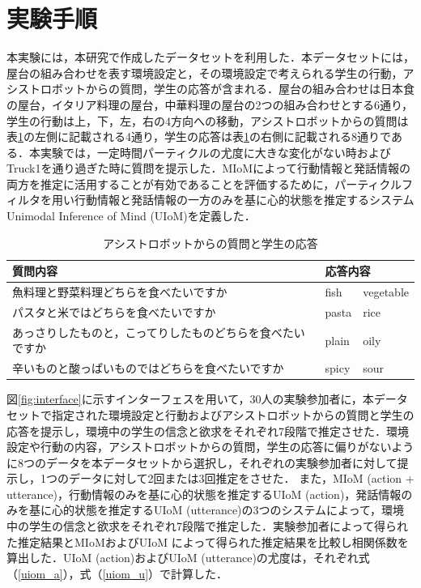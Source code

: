 \section{実験手順}

\par
本実験には，本研究で作成したデータセットを利用した．本データセットには，屋台の組み合わせを表す環境設定と，その環境設定で考えられる学生の行動，アシストロボットからの質問，学生の応答が含まれる．屋台の組み合わせは日本食の屋台，イタリア料理の屋台，中華料理の屋台の2つの組み合わせとする6通り，学生の行動は上，下，左，右の4方向への移動，アシストロボットからの質問は表\ref{tab:q_a}の左側に記載される4通り，学生の応答は表\ref{tab:q_a}の右側に記載される8通りである．本実験では，一定時間パーティクルの尤度に大きな変化がない時およびTruck1を通り過ぎた時に質問を提示した．MIoMによって行動情報と発話情報の両方を推定に活用することが有効であることを評価するために，パーティクルフィルタを用い行動情報と発話情報の一方のみを基に心的状態を推定するシステムUnimodal Inference of Mind (UIoM)を定義した．


\begin{table}[htb]
  \begin{center}
  \caption{アシストロボットからの質問と学生の応答}
  \label{tab:q_a}
  \begin{tabular}{lll} \hline
    質問内容&\multicolumn{2}{l}{応答内容}\\\hline
    魚料理と野菜料理どちらを食べたいですか&fish&vegetable\\
    パスタと米ではどちらを食べたいですか&pasta&rice\\
    あっさりしたものと，こってりしたものどちらを食べたいですか&plain&oily\\
    辛いものと酸っぱいものではどちらを食べたいですか&spicy&sour\\\hline
  \end{tabular}
\end{center}
\end{table}



\par
図\ref{fig:interface}に示すインターフェスを用いて，30人の実験参加者に，本データセットで指定された環境設定と行動およびアシストロボットからの質問と学生の応答を提示し，環境中の学生の信念と欲求をそれぞれ7段階で推定させた．環境設定や行動の内容，アシストロボットからの質問，学生の応答に偏りがないように8つのデータを本データセットから選択し，それぞれの実験参加者に対して提示し，1つのデータに対して2回または3回推定をさせた．
また，MIoM (action + utterance)，行動情報のみを基に心的状態を推定するUIoM (action)，発話情報のみを基に心的状態を推定するUIoM (utterance)の3つのシステムによって，環境中の学生の信念と欲求をそれぞれ7段階で推定した．実験参加者によって得られた推定結果とMIoMおよびUIoM によって得られた推定結果を比較し相関係数を算出した．UIoM (action)およびUIoM (utterance)の尤度は，それぞれ式（\ref{uiom_a}），式（\ref{uiom_u}）で計算した．

